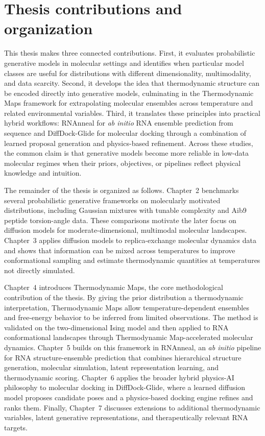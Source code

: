 \section{Thesis contributions and organization}
\label{ch1:sec:contributions-organization}

This thesis makes three connected contributions. First, it evaluates probabilistic generative models in molecular settings and identifies when particular model classes are useful for distributions with different dimensionality, multimodality, and data scarcity. Second, it develops the idea that thermodynamic structure can be encoded directly into generative models, culminating in the Thermodynamic Maps framework for extrapolating molecular ensembles across temperature and related environmental variables. Third, it translates these principles into practical hybrid workflows: RNAnneal for \textit{ab initio} RNA ensemble prediction from sequence and DiffDock-Glide for molecular docking through a combination of learned proposal generation and physics-based refinement. Across these studies, the common claim is that generative models become more reliable in low-data molecular regimes when their priors, objectives, or pipelines reflect physical knowledge and intuition.

The remainder of the thesis is organized as follows. Chapter~2 benchmarks several probabilistic generative frameworks on molecularly motivated distributions, including Gaussian mixtures with tunable complexity and Aib9 peptide torsion-angle data. These comparisons motivate the later focus on diffusion models for moderate-dimensional, multimodal molecular landscapes. Chapter~3 applies diffusion models to replica-exchange molecular dynamics data and shows that information can be mixed across temperatures to improve conformational sampling and estimate thermodynamic quantities at temperatures not directly simulated.

Chapter~4 introduces Thermodynamic Maps, the core methodological contribution of the thesis. By giving the prior distribution a thermodynamic interpretation, Thermodynamic Maps allow temperature-dependent ensembles and free-energy behavior to be inferred from limited observations. The method is validated on the two-dimensional Ising model and then applied to RNA conformational landscapes through Thermodynamic Map-accelerated molecular dynamics. Chapter~5 builds on this framework in RNAnneal, an \textit{ab initio} pipeline for RNA structure-ensemble prediction that combines hierarchical structure generation, molecular simulation, latent representation learning, and thermodynamic scoring. Chapter~6 applies the broader hybrid physics-AI philosophy to molecular docking in DiffDock-Glide, where a learned diffusion model proposes candidate poses and a physics-based docking engine refines and ranks them. Finally, Chapter~7 discusses extensions to additional thermodynamic variables, latent generative representations, and therapeutically relevant RNA targets.
